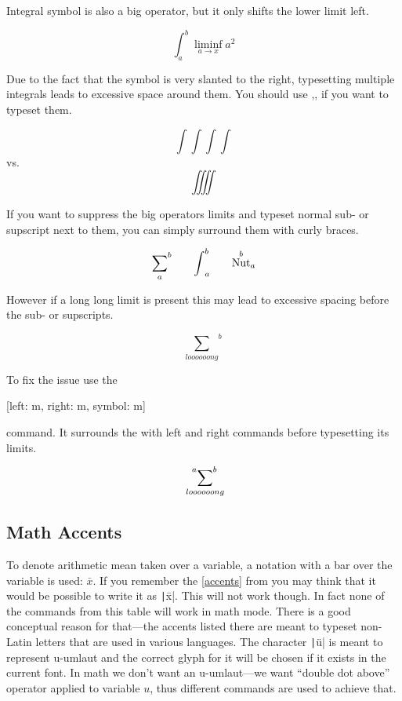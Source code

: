 Integral symbol is also a big operator, but it only shifts the lower limit left.
\begin{example}
\[
  \int_a^b \liminf_{a \to x} a^2
\]
\end{example}
Due to the fact that the symbol is very slanted to the right,
typesetting multiple integrals leads to excessive space around them. You
should use ,, if you want to typeset them.
\begin{example}
\[ \int\int\int\int \]
vs.\ 
\[ \iiiint \]
\end{example}

If you want to suppress the big operators limits and typeset normal sub- or
supscript next to them, you can simply surround them with curly braces.
\begin{example}
\[
  {\sum_{a}}^b
  \qquad%
  {\int}_a^b
  \qquad%
  {\nut^b}_a
\]
\end{example}
However if a long long limit is present this may lead to excessive spacing
before the sub- or supscripts.
\begin{example}
\[ {\sum_{loooooong}}^{b} \]
\end{example}
To fix the issue use the
\begin{lscommand}
  [left: m, right: m, symbol: m]
\end{lscommand}
command. It surrounds the  with left and right commands before
typesetting its limits.
\begin{example}[vertical_mode, examplewidth=0.7\linewidth]
\[ \sideset{^{a}}{^{b}}{\sum}_{loooooong} \]
\end{example}

\subsection{Math Accents}

To denote arithmetic mean taken over a variable, a notation with a bar over the
variable is used: \(\bar x\). If you remember the \autoref{accents} from
\autopageref{accents} you may think that it would be possible to write it as
\texttt|\=x|. This will not work though. In fact none of the
commands from this table will work in math mode. There is a good conceptual
reason for that---the accents listed there are meant to typeset non-Latin
letters that are used in various languages. The character
\texttt|\"u| is meant to represent u-umlaut and the correct glyph
for it will be chosen if it exists in the current font. In math we don't want
an u-umlaut---we want \enquote{double dot above} operator applied to variable
\(u\), thus different commands are used to achieve that.

